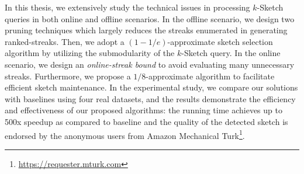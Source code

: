 %

In this thesis, we extensively study
the technical issues in processing $k$-Sketch queries in both online and offline scenarios.
In the offline scenario, we design two pruning techniques which largely
reduces the streaks enumerated in generating ranked-streaks. Then, we adopt a
$(1-1/e)$-approximate sketch selection algorithm by utilizing the 
submodularity of the $k$-Sketch query. In the online scenario, we design
an \emph{online-streak bound} to avoid evaluating many unnecessary streaks. Furthermore,
we propose a $1/8$-approximate algorithm to facilitate efficient sketch maintenance.
In the experimental study, we compare our solutions with baselines using
four real datasets, and the results demonstrate the efficiency and 
effectiveness of our proposed algorithms: the running time
achieves up to 500x speedup as compared to baseline and the quality of the
detected sketch is endorsed by the anonymous users
from Amazon Mechanical Turk\footnote{\url{https://requester.mturk.com}}. 
%



